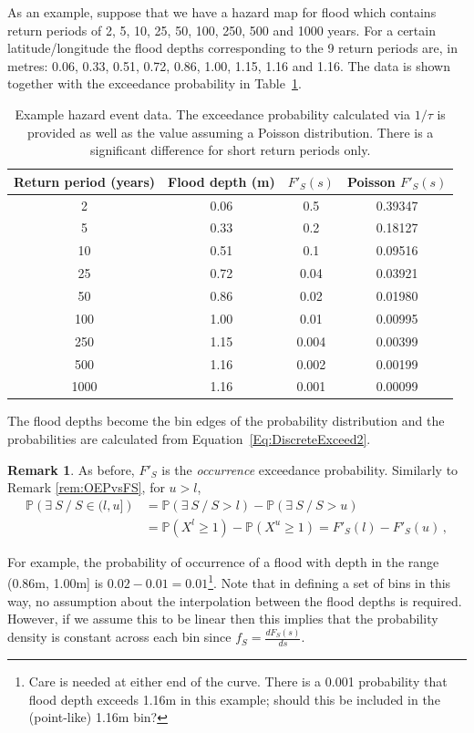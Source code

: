 \documentclass[a4paper,11pt]{extarticle} %
\theoremstyle{definition}
\newtheorem{remarkx}[theorem]{Remark}
\newenvironment{remark}
{\pushQED{\qed}\renewcommand{\qedsymbol}{$\diamond$}\begin{remarkx}}
    {\popQED\end{remarkx}}
\begin{document}
As an example, suppose that we have a hazard map for flood which contains return periods of 2, 5, 10, 25, 50, 100, 250, 500 and 1000 years. For a certain latitude/longitude the flood depths corresponding to the 9 return periods are, in metres: 0.06, 0.33, 0.51, 0.72, 0.86, 1.00, 1.15, 1.16 and 1.16. The data is shown together with the exceedance probability in Table~\ref{Table:HazardData}.

\begin{table}[ht]
    \caption{Example hazard event data. The exceedance probability calculated via $1 / \tau$ is provided as well as the value assuming a Poisson distribution. There is a significant difference for short return periods only. }
    \centering
    \begin{tabular}{c c c c}
        \hline
        Return period (years) & Flood depth (m) & $F'_S(s)$  & Poisson $F'_S(s)$ \\ [0.5ex]
        \hline
2 & 0.06 & 0.5 & 0.39347 \\
5 & 0.33 & 0.2 & 0.18127 \\
10 & 0.51 & 0.1 & 0.09516 \\
25 & 0.72 & 0.04 & 0.03921 \\
50 & 0.86 & 0.02 & 0.01980 \\
100 & 1.00 & 0.01 & 0.00995 \\
250 & 1.15 & 0.004 & 0.00399 \\
500 & 1.16 & 0.002 & 0.00199 \\
1000 & 1.16 & 0.001 & 0.00099 \\
        \hline
    \end{tabular}
    \label{Table:HazardData}
\end{table}

The flood depths become the bin edges of the probability distribution and the probabilities are calculated from Equation~\ref{Eq:DiscreteExceed2}.
\begin{remark}
    As before, $F'_S$ is the \emph{occurrence} exceedance probability. Similarly to Remark \ref{rem:OEPvsFS}, for $u>l$,
    \begin{align*}
        \mathbb{P}\left(\exists~S~/~S\in(l,u]\right)&=\mathbb{P}\left(\exists~S~/~S> l\right) - \mathbb{P}\left(\exists~S~/~S> u\right) \\
        &=
        \mathbb{P}\left(X^l\ge 1\right) - \mathbb{P}\left(X^u\ge 1\right) =
        F'_S(l)-F'_S(u)\,,
    \end{align*}
\end{remark}
For example, the probability of occurrence of a flood with depth in the range (0.86m,  1.00m] is $0.02 - 0.01 = 0.01$\footnote{Care is needed at either end of the curve. There is a 0.001 probability that flood depth exceeds 1.16m in this example; should this be included in the (point-like) 1.16m bin?}. Note that in defining a set of bins in this way, no assumption about the interpolation between the flood depths is required. However, if we assume this to be linear then this implies that the probability density is constant across each bin since $f_S = \frac{dF_S(s)}{ds}$.
\end{document}
